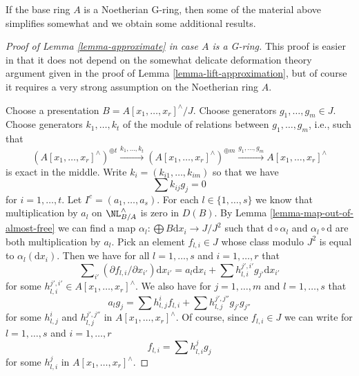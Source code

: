 \noindent
If the base ring $A$ is a Noetherian G-ring, then some of the material
above simplifies somewhat and we obtain some additional results.

\begin{proof}[Proof of Lemma \ref{lemma-approximate} in case $A$ is a G-ring]
This proof is easier in that it does not depend on the somewhat
delicate deformation theory argument given in the proof of
Lemma \ref{lemma-lift-approximation}, but of course it requires
a very strong assumption on the Noetherian ring $A$.

\medskip\noindent
Choose a presentation $B = A[x_1, \ldots, x_r]^\wedge/J$.
Choose generators $g_1, \ldots, g_m \in J$.
Choose generators $k_1, \ldots, k_t$ of the module
of relations between $g_1, \ldots, g_m$, i.e., such that
$$
(A[x_1, \ldots, x_r]^\wedge)^{\oplus t} \xrightarrow{k_1, \ldots, k_t}
(A[x_1, \ldots, x_r]^\wedge)^{\oplus m} \xrightarrow{g_1, \ldots, g_m}
A[x_1, \ldots, x_r]^\wedge
$$
is exact in the middle. Write $k_i = (k_{i1}, \ldots, k_{im})$ so that we have
\begin{equation}
\label{equation-relations-straight-up}
\sum k_{ij}g_j = 0
\end{equation}
for $i = 1, \ldots, t$.
Let $I^c = (a_1, \ldots, a_s)$. For each $l \in \{1, \ldots, s\}$
we know that multiplication by $a_l$ on $\NL^\wedge_{B/A}$ is zero
in $D(B)$. By Lemma \ref{lemma-map-out-of-almost-free} we can find a map
$\alpha_l : \bigoplus B\text{d}x_i \to J/J^2$ such that
$\text{d} \circ \alpha_l$ and $\alpha_l \circ \text{d}$ are both
multiplication by $a_l$. Pick an element $f_{l, i} \in J$ whose
class modulo $J^2$ is equal to $\alpha_l(\text{d}x_i)$.
Then we have for all $l = 1, \ldots, s$ and $i = 1, \ldots, r$ that
\begin{equation}
\label{equation-derivatives}
\sum\nolimits_{i'} (\partial f_{l, i}/ \partial x_{i'}) \text{d}x_{i'} =
a_l \text{d}x_i + \sum h_{l, i}^{j', i'} g_{j'} \text{d}x_{i'}
\end{equation}
for some $h_{l, i}^{j', i'} \in A[x_1, \ldots, x_r]^\wedge$.
We also have for $j = 1, \ldots, m$ and $l = 1, \ldots, s$ that
\begin{equation}
\label{equation-ci}
a_l g_j = \sum h_{l, j}^if_{l, i} + \sum h_{l, j}^{j', j''}g_{j'} g_{j''}
\end{equation}
for some $h_{l, j}^i$ and $h_{l, j}^{j', j''}$ in
$A[x_1, \ldots, x_r]^\wedge$. Of course, since $f_{l, i} \in J$
we can write for $l = 1, \ldots, s$ and $i = 1, \ldots, r$
\begin{equation}
\label{equation-in-ideal}
f_{l, i} = \sum h_{l, i}^jg_j
\end{equation}
for some $h_{l, i}^j$ in $A[x_1, \ldots, x_r]^\wedge$.


\end{proof}
